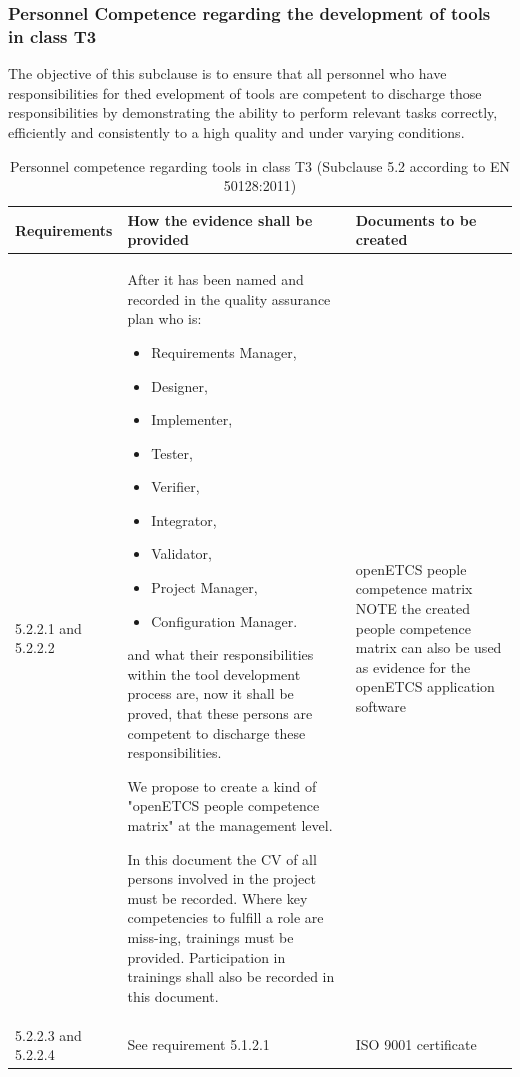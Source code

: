 \documentclass{template/openetcs_report}
\begin{document}
\subsubsection{Personnel Competence regarding the development of tools in class T3}
\begin{flushleft}
The objective of this subclause is to ensure that all personnel who have responsibilities for thed evelopment of tools are competent to discharge those responsibilities by demonstrating the ability to perform relevant tasks correctly, efficiently and consistently to a high quality and under varying conditions.
\end{flushleft}
{\footnotesize\sffamily\centering
\begin{longtable}{|p{2cm}|p{9cm}|p{3cm}|}
\caption{Personnel competence regarding tools in class T3 (Subclause 5.2 according to EN 50128:2011)}\\
\hline
\bfseries Requirements & \bfseries How the evidence shall be provided & \bfseries Documents to be created\\
\hline
\hline
\endhead
\hline
\endfoot

5.2.2.1 and 5.2.2.2 & After it has been named and recorded in the quality assurance plan who is:
\begin{itemize}\itemsep=0pt
  \item Requirements Manager,
  \item Designer,
  \item Implementer,
  \item Tester,
  \item Verifier,
  \item Integrator,
  \item Validator,
  \item Project Manager,
  \item Configuration Manager.
\end{itemize}
and what their responsibilities within the tool development process are, now it shall be proved, that these persons are competent to discharge these responsibilities.

We propose to create a kind of "openETCS people competence matrix" at the management level. 

In this document the CV of all persons involved in the project must be recorded.
Where key competencies to fulfill a role are miss-ing, trainings must be provided.
Participation in trainings shall also be recorded in this document.
& openETCS people competence matrix
\linebreak
\linebreak
NOTE\linebreak
the created people competence matrix can also be used as evidence for the openETCS application software\\ 
\hline
5.2.2.3 and 5.2.2.4 & See requirement 5.1.2.1 & ISO 9001 certificate\\ 
\hline
\end{longtable}}
\end{document}
